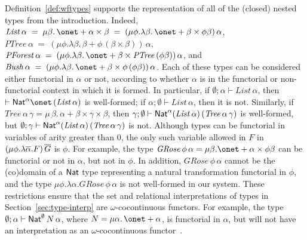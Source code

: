 \documentclass[runningheads]{llncs}
\begin{document}
Definition~\ref{def:wftypes} supports the representation of all of the
(closed) nested types from the introduction. Indeed, $\mathit{List}\,
\alpha \; = \; \mu \beta. \,\onet + \alpha \times \beta\; = \; (\mu
\phi. \lambda \beta.\,\onet + \beta \times \phi \beta)\,\alpha$,\,
$\mathit{PTree}\,\alpha \; = \; (\mu \phi. \lambda \beta.\,\beta +
\phi\,(\beta \times \beta))\,\alpha$, \, $\mathit{PForest}\,\alpha \;
= \; (\mu \phi. \lambda \beta. \,\onet + \beta \times
\mathit{PTree}\,(\phi \beta))\,\alpha$, and $\mathit{Bush}\,\alpha \;
= \; (\mu \phi.\lambda \beta. \,\onet + \beta \times
\phi\,(\phi\beta))\,\alpha$.  Each of these types can be considered
either functorial in $\alpha$ or not, according to whether $\alpha$ is
in the functorial or non-functorial context in which it is formed. In
particular, if $\emptyset;\alpha \vdash \mathit{List} \,\alpha$, then
$\vdash \Nat^\alpha \onet\, (\mathit{List}\,\alpha)$ is well-formed;
if $\alpha;\emptyset \vdash \mathit{List} \,\alpha$, then it is not.
Similarly, if $\mathit{Tree}\,\alpha\,\gamma = \mu \,\beta.\, \alpha +
\beta \times \gamma \times \beta$, then $\gamma;\emptyset \vdash
\mathsf{Nat}^\alpha (\mathit{List}\, \alpha) \, (\mathit{Tree} \, \alpha\,
\gamma)$ is well-formed, but $\emptyset;\gamma \vdash \mathsf{Nat}^\alpha
(\mathit{List}\, \alpha) \, (\mathit{Tree} \, \alpha\, \gamma)$ is
not. Although types can be functorial in variables of arity greater
than $0$, the only such variable allowed in $F$ in $(\mu \phi.\lambda
\overline{\alpha}.F)\,\overline{G}$ is $\phi$.
For example, the type $\mathit{GRose}\, \phi \, \alpha =
\mu\beta . \onet + \alpha \times \phi \beta$ can be functorial or not in
$\alpha$, but not in $\phi$. In addition,
$\mathit{GRose}\,\phi\,\alpha$ cannot be the (co)domain of a $\mathsf{Nat}$
type representing a natural transformation functorial in $\phi$, and
the type $\mu \phi. \lambda \alpha. \mathit{GRose}\,\phi\,\alpha$ is
not well-formed in our system. These restrictions ensure that the set
and relational interpretations of types in
Section~\ref{sec:type-interp} are $\omega$-cocontinuous functors. For
example, the type $\emptyset; \alpha \vdash \mathsf{Nat}^\emptyset \, N \,
\alpha$, where $N = \mu \alpha. \,\onet + \alpha$, is functorial in
$\alpha$, but will not have an interpretation as an
$\omega$-cocontinuous functor~\cite{jp19}.
\end{document}
